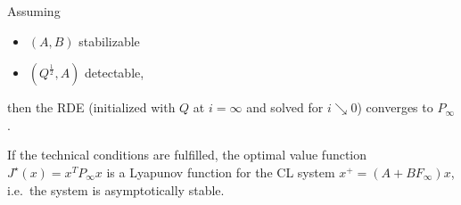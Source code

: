 \newpar{}

Assuming
\begin{itemize}
    \item $(A,B)$ stabilizable
    \item $(Q^{\frac{1}{2}}, A)$ detectable,
\end{itemize}
then the RDE (initialized with $Q$ at $i = \infty$ and solved for $i\searrow 0$) converges to $P_{\infty}$.

\newpar{}

If the technical conditions are fulfilled, the optimal value function $J^{\star} (x) = x^T P_{\infty} x$ is a Lyapunov function for the CL system $x^+ = (A + BF_{\infty} )x$, i.e.\ the system is asymptotically stable.




